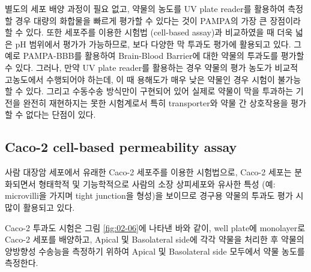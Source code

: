 \documentclass[
  11pt,
  krantz2, a4paper, twoside]{krantz}
\begin{document}
별도의 세포 배양 과정이 필요 없고, 약물의 농도를 UV plate reader를 활용하여 측정할 경우 대량의 화합물을 빠르게 평가할 수 있다는 것이 PAMPA의 가장 큰 장점이라 할 수 있다.
또한 세포주를 이용한 시험법 (cell-based assay)과 비교하였을 때 더욱 넓은 pH 범위에서 평가가 가능하므로, 보다 다양한 막 투과도 평가에 활용되고 있다.
그 예로 PAMPA-BBB를 활용하여 Brain-Blood Barrier에 대한 약물의 투과도를 평가할 수 있다.
그러나, 만약 UV plate reader를 활용하는 경우 약물의 평가 농도가 비교적 고농도에서 수행되어야 하는데, 이 때 용해도가 매우 낮은 약물인 경우 시험이 불가능할 수 있다.
그리고 수동수송 방식만이 구현되어 있어 실제로 약물이 막을 투과하는 기전을 완전히 재현하지는 못한 시험계로서 특히 transporter와 약물 간 상호작용을 평가할 수 없다는 단점이 있다.

\hypertarget{caco-2-cell-based-permeability-assay}{%
\subsection{Caco-2 cell-based permeability assay}\label{caco-2-cell-based-permeability-assay}}

사람 대장암 세포에서 유래한 Caco-2 세포주를 이용한 시험법으로, Caco-2
세포는 분화되면서 형태학적 및 기능학적으로 사람의 소장 상피세포와 유사한
특성 (예: microvilli을 가지며 tight junction을 형성)을 보이므로 경구용
약물의 투과도 평가 시 많이 활용되고 있다.

Caco-2 투과도 시험은 그림 \ref{fig:02-06}에 나타낸 바와 같이, well plate에
monolayer로 Caco-2 세포를 배양하고, Apical 및 Basolateral side에 각각
약물을 처리한 후 약물의 양방향성 수송능을 측정하기 위하여 Apical 및
Basolateral side 모두에서 약물 농도를 측정한다.
\end{document}

